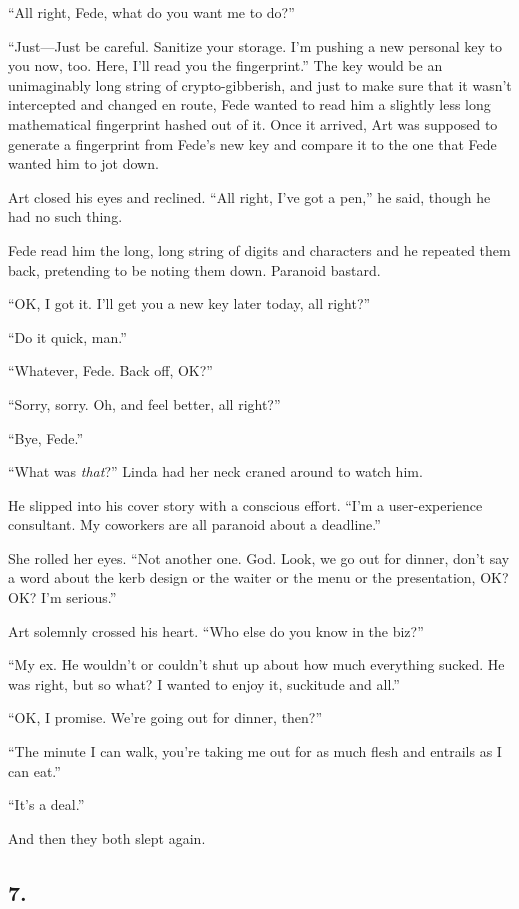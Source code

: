 “All right, Fede, what do you want me to do?”

“Just—Just be careful. Sanitize your storage. I’m pushing a new
personal key to you now, too. Here, I’ll read you the fingerprint.”
The key would be an unimaginably long string of crypto-gibberish,
and just to make sure that it wasn’t intercepted and changed en
route, Fede wanted to read him a slightly less long mathematical
fingerprint hashed out of it. Once it arrived, Art was supposed to
generate a fingerprint from Fede’s new key and compare it to the
one that Fede wanted him to jot down.

Art closed his eyes and reclined. “All right, I’ve got a pen,” he
said, though he had no such thing.

Fede read him the long, long string of digits and characters and he
repeated them back, pretending to be noting them down. Paranoid
bastard.

“OK, I got it. I’ll get you a new key later today, all right?”

“Do it quick, man.”

“Whatever, Fede. Back off, OK?”

“Sorry, sorry. Oh, and feel better, all right?”

“Bye, Fede.”

“What was \emph{that}?” Linda had her neck craned around to watch
him.

He slipped into his cover story with a conscious effort. “I’m a
user-experience consultant. My coworkers are all paranoid about a
deadline.”

She rolled her eyes. “Not another one. God. Look, we go out for
dinner, don’t say a word about the kerb design or the waiter or the
menu or the presentation, OK? OK? I’m serious.”

Art solemnly crossed his heart. “Who else do you know in the biz?”

“My ex. He wouldn’t or couldn’t shut up about how much everything
sucked. He was right, but so what? I wanted to enjoy it, suckitude
and all.”

“OK, I promise. We’re going out for dinner, then?”

“The minute I can walk, you’re taking me out for as much flesh and
entrails as I can eat.”

“It’s a deal.”

And then they both slept again.

\subsection{7.}

